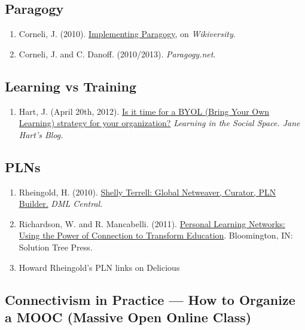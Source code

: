 \subsection{Paragogy}

\begin{enumerate}
\item
  Corneli, J. (2010). \href{http://metameso.org/~joe/docs/paragogy-lesson.pdf}{Implementing Paragogy}, on \emph{Wikiversity}.
\item
  Corneli, J. and C. Danoff. (2010/2013). \emph{Paragogy.net}.
\end{enumerate}

\subsection{Learning vs Training}

\begin{enumerate}
\item
  Hart, J. (April 20th, 2012). \href{http://www.c4lpt.co.uk/blog/2012/04/20/is-it-time-for-a-byol-bring-your-own-learning-strategy-in-your-organization-byol/}{Is it time for a BYOL (Bring Your Own
  Learning) strategy for your organization?} \emph{Learning in the Social
  Space. Jane Hart's Blog.}
\end{enumerate}

\subsection{PLNs}

\begin{enumerate}
\item
  Rheingold, H. (2010).
  \href{http://dmlcentral.net/blog/howard-rheingold/shelly-terrell-global-netweaver-curator-pln-builder}{Shelly
  Terrell: Global Netweaver, Curator, PLN Builder.} \emph{DML
  Central}.
\item
  Richardson, W. and R. Mancabelli. (2011).
  \href{http://www.amazon.com/Personal-Learning-Networks-Connections-Transform/dp/193554327X}{Personal
  Learning Networks: Using the Power of Connection to Transform
  Education}. Bloomington, IN: Solution Tree Press.
\item
  Howard Rheingold's PLN links on Delicious
\end{enumerate}

\subsection{Connectivism in Practice --- How to Organize a MOOC (Massive
Open Online Class)}

